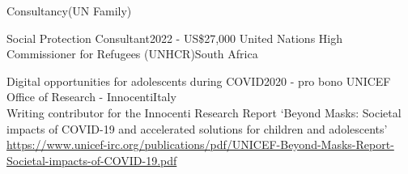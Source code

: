 \begin{rSection}{Consultancy(UN Family)}

\begin{rSubsection}
{Social Protection Consultant}{2022 - US\$27,000}
{United Nations High Commissioner for Refugees (UNHCR)}{South Africa}\par
\end{rSubsection}

\begin{rSubsection}
{Digital opportunities for adolescents during COVID}{2020 - pro bono}
{UNICEF Office of Research - Innocenti}{Italy}\\
Writing contributor for the Innocenti Research Report ‘Beyond Masks: Societal impacts of COVID-19 and accelerated solutions for children and adolescents' \url{https://www.unicef-irc.org/publications/pdf/UNICEF-Beyond-Masks-Report-Societal-impacts-of-COVID-19.pdf}
\end{rSubsection}

\end{rSection}
